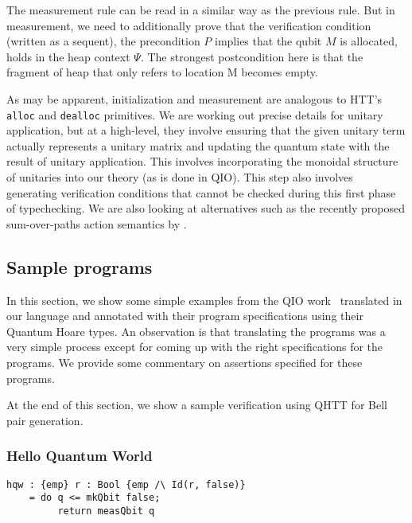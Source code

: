 \documentclass[acmsmall,nonacm,timestamp,review=false,anonymous=false]{acmart}
\begin{document}
The measurement rule can be read in a similar way as the previous rule. But in measurement, we need to additionally prove that the verification condition (written as a sequent), the precondition $P$ implies that the qubit $M$ is allocated, holds in the heap context $\Psi$. The strongest postcondition here is that the fragment of heap that only refers to location M becomes empty.

As may be apparent, initialization and measurement are analogous to HTT's \texttt{alloc} and \texttt{dealloc} primitives. We are working out precise details for unitary application, but at a high-level, they involve ensuring that the given unitary term actually represents a unitary matrix and updating the quantum state with the result of unitary application. This involves incorporating the monoidal structure of unitaries into our theory (as is done in QIO). This step also involves generating verification conditions that cannot be checked during this first phase of typechecking. We are also looking at alternatives such as the recently proposed sum-over-paths action semantics by \citet{amy18}.

\subsection{Sample programs}
\label{sec:examples}

In this section, we show some simple examples from the QIO work~\cite{qio} translated in our language and annotated with their program specifications using their Quantum Hoare types. An observation is that translating the programs was a very simple process except for coming up with the right specifications for the programs. We provide some commentary on assertions specified for these programs.

At the end of this section, we show a sample verification using QHTT for Bell pair generation.

\subsubsection{Hello Quantum World}
\leavevmode

\begin{minipage}{0.95\linewidth}
\begin{lstlisting}[language=QHaskell]
hqw : {emp} r : Bool {emp /\ Id(r, false)}
    = do q <= mkQbit false;
         return measQbit q
\end{lstlisting}
\end{minipage}
\end{document}
